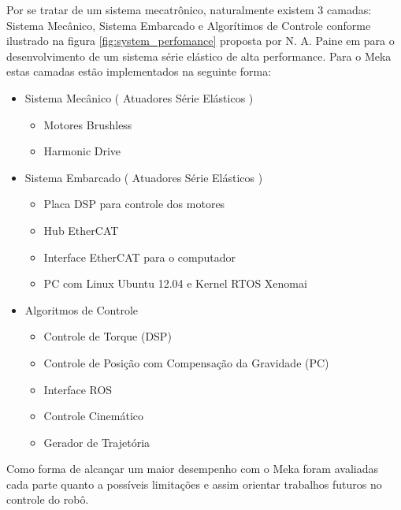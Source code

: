 Por se tratar de um sistema mecatrônico, naturalmente existem 3 camadas: Sistema Mecânico, Sistema Embarcado e Algorítimos de Controle conforme ilustrado na figura \ref{fig:system_perfomance} proposta por N. A. Paine em \cite{paine2014high} para o desenvolvimento de um sistema série elástico de alta performance. Para o Meka estas camadas estão implementados na seguinte forma:

\begin{itemize}
    \item Sistema Mecânico ( Atuadores Série Elásticos )
    \begin{itemize}
        \item Motores Brushless
        \item Harmonic Drive
    \end{itemize}
    \item Sistema Embarcado ( Atuadores Série Elásticos )
    \begin{itemize}
        \item Placa DSP para controle dos motores
        \item Hub EtherCAT
        \item Interface EtherCAT para o computador
        \item PC com Linux Ubuntu 12.04 e Kernel RTOS Xenomai
    \end{itemize}
    \item Algoritmos de Controle
    \begin{itemize}
        \item Controle de Torque (DSP)
        \item Controle de Posição com Compensação da Gravidade (PC)
        \item Interface ROS
        \item Controle Cinemático
        \item Gerador de Trajetória
    \end{itemize}
\end{itemize}

Como forma de alcançar um maior desempenho com o Meka foram avaliadas cada parte quanto a possíveis limitações e assim orientar trabalhos futuros no controle do robô.



